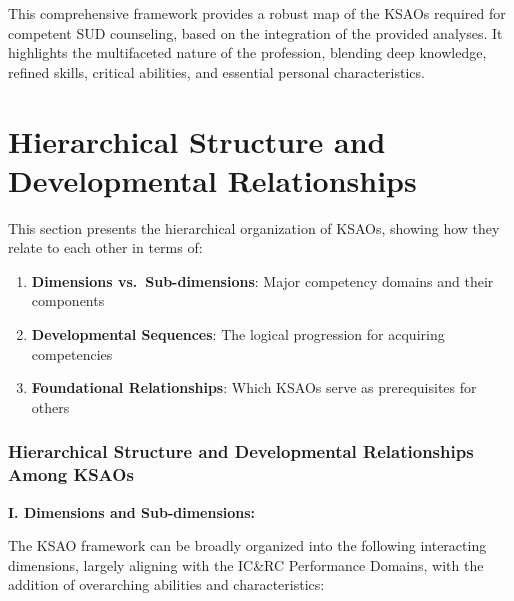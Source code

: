 \documentclass[
  letterpaper,
  DIV=11,
  numbers=noendperiod]{scrartcl}
\providecommand{\tightlist}{%
  \setlength{\itemsep}{0pt}\setlength{\parskip}{0pt}}
\begin{document}
This comprehensive framework provides a robust map of the KSAOs required
for competent SUD counseling, based on the integration of the provided
analyses. It highlights the multifaceted nature of the profession,
blending deep knowledge, refined skills, critical abilities, and
essential personal characteristics.

\section{Hierarchical Structure and Developmental
Relationships}\label{hierarchical-structure-and-developmental-relationships}

This section presents the hierarchical organization of KSAOs, showing
how they relate to each other in terms of:

\begin{enumerate}
\def\labelenumi{\arabic{enumi}.}
\tightlist
\item
  \textbf{Dimensions vs.~Sub-dimensions}: Major competency domains and
  their components
\item
  \textbf{Developmental Sequences}: The logical progression for
  acquiring competencies
\item
  \textbf{Foundational Relationships}: Which KSAOs serve as
  prerequisites for others
\end{enumerate}

\subsubsection{Hierarchical Structure and Developmental Relationships
Among
KSAOs}\label{hierarchical-structure-and-developmental-relationships-among-ksaos-1}

\textbf{I. Dimensions and Sub-dimensions:}

The KSAO framework can be broadly organized into the following
interacting dimensions, largely aligning with the IC\&RC Performance
Domains, with the addition of overarching abilities and characteristics:
\end{document}
